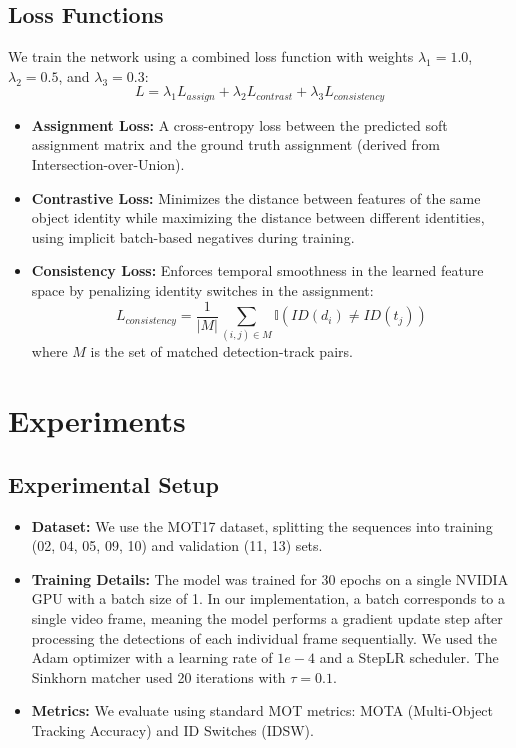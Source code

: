 \documentclass{article}
\begin{document}
\subsection{Loss Functions}

We train the network using a combined loss function with weights $\lambda_1=1.0$, $\lambda_2=0.5$, and $\lambda_3=0.3$:
$$L = \lambda_1 L_{assign} + \lambda_2 L_{contrast} + \lambda_3 L_{consistency}$$
\begin{itemize}
  \item \textbf{Assignment Loss:} A cross-entropy loss between the predicted soft assignment matrix and the ground truth assignment (derived from Intersection-over-Union).
  \item \textbf{Contrastive Loss:} Minimizes the distance between features of the same object identity while maximizing the distance between different identities, using implicit batch-based negatives during training.
  \item \textbf{Consistency Loss:} Enforces temporal smoothness in the learned feature space by penalizing identity switches in the assignment:
  $$L_{consistency} = \frac{1}{|M|} \sum_{(i,j) \in M} \mathbb{I}(ID(d_i) \neq ID(t_j))$$
  where $M$ is the set of matched detection-track pairs.
\end{itemize}

\section{Experiments}

\subsection{Experimental Setup}

\begin{itemize}
  \item \textbf{Dataset:} We use the MOT17 dataset, splitting the sequences into training (02, 04, 05, 09, 10) and validation (11, 13) sets.
  \item \textbf{Training Details:} The model was trained for 30 epochs on a single NVIDIA GPU with a batch size of 1. In our implementation, a batch corresponds to a single video frame, meaning the model performs a gradient update step after processing the detections of each individual frame sequentially. We used the Adam optimizer with a learning rate of $1e-4$ and a StepLR scheduler. The Sinkhorn matcher used 20 iterations with $\tau=0.1$.
  \item \textbf{Metrics:} We evaluate using standard MOT metrics: MOTA (Multi-Object Tracking Accuracy) and ID Switches (IDSW).
\end{itemize}
\end{document}
